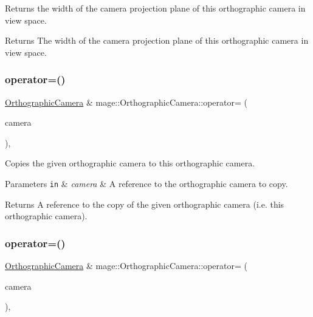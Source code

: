 Returns the width of the camera projection plane of this orthographic camera in view space.

\begin{DoxyReturn}{Returns}
The width of the camera projection plane of this orthographic camera in view space. 
\end{DoxyReturn}
\hypertarget{classmage_1_1_orthographic_camera_aa436ca54df7a7ca28642674e8f3db98f}{}\label{classmage_1_1_orthographic_camera_aa436ca54df7a7ca28642674e8f3db98f} 
\subsubsection{\texorpdfstring{operator=()}{operator=()}\hspace{0.1cm}{\footnotesize\ttfamily [1/2]}}
{\footnotesize\ttfamily \hyperlink{classmage_1_1_orthographic_camera}{Orthographic\+Camera} \& mage\+::\+Orthographic\+Camera\+::operator= (\begin{DoxyParamCaption}\item[{const \hyperlink{classmage_1_1_orthographic_camera}{Orthographic\+Camera} \&}]{camera }\end{DoxyParamCaption})\hspace{0.3cm}{\ttfamily [default]}, {\ttfamily [noexcept]}}

Copies the given orthographic camera to this orthographic camera.


\begin{DoxyParams}[1]{Parameters}
\mbox{\tt in}  & {\em camera} & A reference to the orthographic camera to copy. \\
\hline
\end{DoxyParams}
\begin{DoxyReturn}{Returns}
A reference to the copy of the given orthographic camera (i.\+e. this orthographic camera). 
\end{DoxyReturn}
\hypertarget{classmage_1_1_orthographic_camera_a8ea3c026f05b743ee88eb2c1f126238f}{}\label{classmage_1_1_orthographic_camera_a8ea3c026f05b743ee88eb2c1f126238f} 
\subsubsection{\texorpdfstring{operator=()}{operator=()}\hspace{0.1cm}{\footnotesize\ttfamily [2/2]}}
{\footnotesize\ttfamily \hyperlink{classmage_1_1_orthographic_camera}{Orthographic\+Camera} \& mage\+::\+Orthographic\+Camera\+::operator= (\begin{DoxyParamCaption}\item[{\hyperlink{classmage_1_1_orthographic_camera}{Orthographic\+Camera} \&\&}]{camera }\end{DoxyParamCaption})\hspace{0.3cm}{\ttfamily [default]}, {\ttfamily [noexcept]}}

